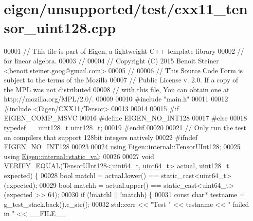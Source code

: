 \hypertarget{eigen_2unsupported_2test_2cxx11__tensor__uint128_8cpp_source}{}\section{eigen/unsupported/test/cxx11\+\_\+tensor\+\_\+uint128.cpp}
\label{eigen_2unsupported_2test_2cxx11__tensor__uint128_8cpp_source}

\begin{DoxyCode}
00001 \textcolor{comment}{// This file is part of Eigen, a lightweight C++ template library}
00002 \textcolor{comment}{// for linear algebra.}
00003 \textcolor{comment}{//}
00004 \textcolor{comment}{// Copyright (C) 2015 Benoit Steiner <benoit.steiner.goog@gmail.com>}
00005 \textcolor{comment}{//}
00006 \textcolor{comment}{// This Source Code Form is subject to the terms of the Mozilla}
00007 \textcolor{comment}{// Public License v. 2.0. If a copy of the MPL was not distributed}
00008 \textcolor{comment}{// with this file, You can obtain one at http://mozilla.org/MPL/2.0/.}
00009 
00010 \textcolor{preprocessor}{#include "main.h"}
00011 
00012 \textcolor{preprocessor}{#include <Eigen/CXX11/Tensor>}
00013 
00014 
00015 \textcolor{preprocessor}{#if EIGEN\_COMP\_MSVC}
00016 \textcolor{preprocessor}{#define EIGEN\_NO\_INT128}
00017 \textcolor{preprocessor}{#else}
00018 \textcolor{keyword}{typedef} \_\_uint128\_t uint128\_t;
00019 \textcolor{preprocessor}{#endif}
00020 
00021 \textcolor{comment}{// Only run the test on compilers that support 128bit integers natively}
00022 \textcolor{preprocessor}{#ifndef EIGEN\_NO\_INT128}
00023 
00024 \textcolor{keyword}{using} \hyperlink{struct_eigen_1_1internal_1_1_tensor_u_int128}{Eigen::internal::TensorUInt128};
00025 \textcolor{keyword}{using} \hyperlink{struct_eigen_1_1internal_1_1static__val}{Eigen::internal::static\_val};
00026 
00027 \textcolor{keywordtype}{void} VERIFY\_EQUAL(\hyperlink{struct_eigen_1_1internal_1_1_tensor_u_int128}{TensorUInt128<uint64\_t, uint64\_t>} actual, uint128\_t 
      expected) \{
00028   \textcolor{keywordtype}{bool} matchl = actual.lower() == \textcolor{keyword}{static\_cast<}uint64\_t\textcolor{keyword}{>}(expected);
00029   \textcolor{keywordtype}{bool} matchh = actual.upper() == \textcolor{keyword}{static\_cast<}uint64\_t\textcolor{keyword}{>}(expected >> 64);
00030   \textcolor{keywordflow}{if} (!matchl || !matchh) \{
00031     \textcolor{keyword}{const} \textcolor{keywordtype}{char}* testname = g\_test\_stack.back().c\_str();
00032     std::cerr << \textcolor{stringliteral}{"Test "} << testname << \textcolor{stringliteral}{" failed in "} << \_\_FILE\_\_

\end{DoxyCode}
